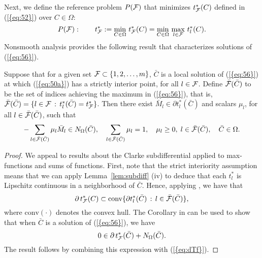 \documentclass{siamltex}
\begin{document}
Next, we define the reference problem $P({{\cal F}})$ that minimizes
$t^*_{{\cal F}}(C)$ defined in {(\ref{{eq:52}})} over $C \in \Omega$:
\begin{equation} \label{eq:56}
P({{\cal F}}): \qquad t^*_{{\cal F}} := \min_{C \in \Omega} \,  t^*_{{\cal F}}(C) =
\min_{C \in \Omega} \, \max_{l \in {{\cal F}}} \, t^*_l(C).
\end{equation}
Nonsmooth analysis provides the following result that characterizes
solutions of {(\ref{{eq:56}})}.
\begin{lemma} \label{lem:pfstat} Suppose that for a given
set ${{\cal F}} \subset \{1,2,\dotsc,m\}$, $\bar{C}$ is a local
  solution of {(\ref{{eq:56}})} at which 
  {(\ref{{eq:50a}})} has a strictly interior point, for all $l \in
  {{\cal F}}$. Define $\bar{{\cal F}}(\bar{C})$ to be the set of indices achieving
  the maximum in {(\ref{{eq:56}})}, that is, $\bar{{\cal F}}(\bar{C}) = \{ l
  \in {{\cal F}} \, : \, t^*_l(\bar{C}) = t^*_{{\cal F}} \}$. Then there exist
  $\bar{M}_l \in \partial t^*_l(\bar{C})$ and scalars $\mu_l$, for
  all $l \in \bar{{\cal F}}(\bar{C})$, such that
\begin{equation} \label{eq:56opt}
-\sum_{l \in \bar{{\cal F}}(\bar{C})} \mu_l \bar{M}_l \in N_{\Omega}(\bar{C}), 
\quad
\sum_{l \in \bar{{\cal F}}(\bar{C})} \mu_l = 1,
\quad
\mu_l \ge 0, \; l \in  \bar{{\cal F}}(\bar{C}), 
\quad
\bar{C} \in \Omega.
\end{equation}
\end{lemma}
\begin{proof}
  We appeal to results about the Clarke subdifferential applied to
  max-functions and sums of functions.  First, note that the strict
  interiority assumption means that we can apply
  Lemma~\ref{lem:subdiff} (iv) to deduce that each $t^*_l$ is
  Lipschitz continuous in a neighborhood of $\bar{C}$.  Hence,
  applying \cite[Theorem~6.1.5]{BorL00}, we have that
\begin{equation} \label{eq:dTf}
  \partial \, t^*_{{\cal F}}(C)  \subset
  \mbox{conv} \{ \partial t^*_l(\bar{C}) \, : \, l \in \bar{{\cal F}} (\bar{C}) \},
\end{equation}
where $\mbox{conv}(\cdot)$ denotes the convex hull.  The Corollary in
\cite[p.~52]{Cla83} can be used to show that when $\bar{C}$ is a
solution of {(\ref{{eq:56}})}, we have
\[
0 \in \partial \, t^*_{{\cal F}}(\bar{C}) + N_{\Omega}(\bar{C}).
\]
The result follows by combining this expression with {(\ref{{eq:dTf}})}.
\end{proof}
\end{document}
